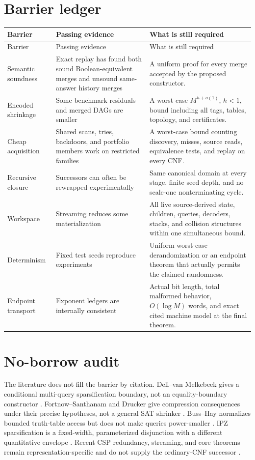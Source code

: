 \documentclass[11pt]{article}
\begin{document}
\section{Barrier ledger}

\begin{longtable}{L{0.20\textwidth}L{0.34\textwidth}L{0.38\textwidth}}
\toprule
Barrier & Passing evidence & What is still required \\
\midrule
\endfirsthead
\toprule
Barrier & Passing evidence & What is still required \\
\midrule
\endhead
\bottomrule
\endfoot
Semantic soundness & Exact replay has found both sound Boolean-equivalent
merges and unsound same-answer history merges & A uniform proof for every
merge accepted by the proposed constructor. \\
Encoded shrinkage & Some benchmark residuals and merged DAGs are smaller & A
worst-case $M^{h+o(1)}$, $h<1$, bound including all tags, tables, topology,
and certificates. \\
Cheap acquisition & Shared scans, tries, backdoors, and portfolio members
work on restricted families & A worst-case bound counting discovery, misses,
source reads, equivalence tests, and replay on every CNF. \\
Recursive closure & Successors can often be rewrapped experimentally & Same
canonical domain at every stage, finite seed depth, and no scale-one
nonterminating cycle. \\
Workspace & Streaming reduces some materialization & All live source-derived
state, children, queries, decoders, stacks, and collision structures within
one simultaneous bound. \\
Determinism & Fixed test seeds reproduce experiments & Uniform worst-case
derandomization or an endpoint theorem that actually permits the claimed
randomness. \\
Endpoint transport & Exponent ledgers are internally consistent & Actual bit
length, total malformed behavior, $O(\log M)$ words, and exact cited machine
model at the final theorem. \\
\end{longtable}

\section{No-borrow audit}

The literature does not fill the barrier by citation.  Dell--van Melkebeek
gives a conditional multi-query sparsification boundary, not an
equality-boundary constructor \cite{dellvanmelkebeek2014}.
Fortnow--Santhanam and Drucker give compression consequences under their
precise hypotheses, not a general SAT shrinker
\cite{fortnowsanthanam2011,drucker2015}.  Buss--Hay normalizes bounded
truth-table access but does not make queries power-smaller
\cite{busshay1991}.  IPZ sparsification is a fixed-width, parameterized
disjunction with a different quantitative envelope \cite{ipz2001}.
Recent CSP redundancy, streaming, and core theorems remain
representation-specific and do not supply the ordinary-CNF successor
\cite{brakensiekguruswami2026,sharmavelusamy2026,brakensiekputterman2026}.
\end{document}
